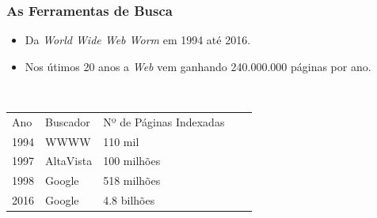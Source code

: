 \documentclass{beamer}
\begin{document}
\begin{frame}
	\frametitle{As Ferramentas de Busca}
	
\begin{itemize}
	\item Da \textit{World Wide Web Worm} em 1994 até 2016.
	\vspace{0.3cm}
	\item Nos útimos 20 anos a \textit{Web} vem ganhando 240.000.000 páginas por ano. 
\end{itemize}	
	
\
\begin{table}[!htb]
\centering
\begin{tabular}{lllll}
Ano & Buscador & Nº de Páginas Indexadas\\
1994 & WWWW & 110 mil\\
1997 & AltaVista & 100 milhões\\
1998 & Google & 518 milhões\\
2016 & Google & 4.8 bilhões
\end{tabular}
\end{table}
	
\end{frame}
\end{document}
